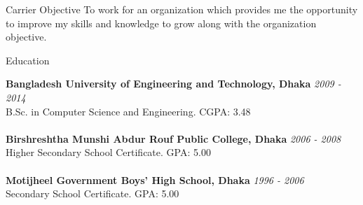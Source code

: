 \documentclass{resume} %
\begin{document}
\begin{rSection}{Carrier Objective}
 To work for an organization which provides me the opportunity to improve my skills and knowledge to grow along with the organization objective.
\end{rSection}


\begin{rSection}{Education}

{\bf Bangladesh University of Engineering and Technology, Dhaka} \hfill {\em 2009 - 2014} 
\\ B.Sc. in Computer Science and Engineering.\hfill { CGPA: 3.48 }
\\
\\{\bf Birshreshtha Munshi Abdur Rouf Public College, Dhaka} \hfill {\em 2006 - 2008} 
\\ Higher Secondary School Certificate.\hfill { GPA: 5.00 }
\\
\\{\bf Motijheel Government Boys'​ High School, Dhaka} \hfill {\em 1996 - 2006} 
\\ Secondary School Certificate.\hfill { GPA: 5.00 }


\end{rSection}



\end{document}
